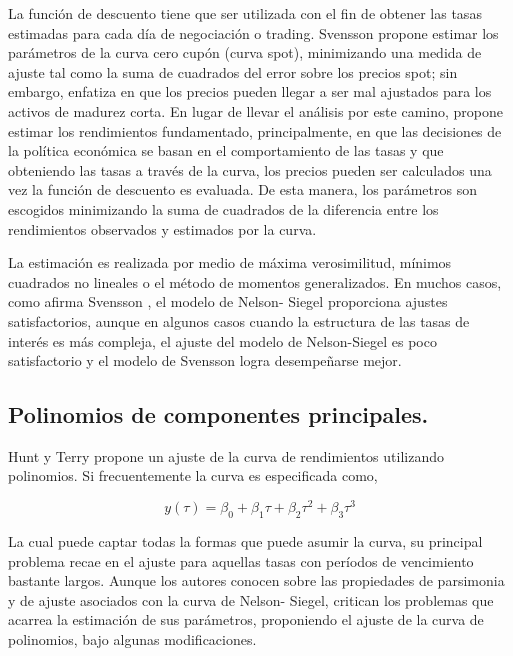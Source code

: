 \hspace*{0.4 cm} La funci\'on de descuento tiene que ser utilizada con el fin de obtener las
tasas estimadas para cada d\'ia de negociaci\'on o trading. Svensson \cite{Sv}
propone estimar los par\'ametros de la curva cero cup\'on (curva spot),
minimizando una medida de ajuste tal como la suma de cuadrados del
error sobre los precios spot; sin embargo, enfatiza en que los precios
pueden llegar a ser mal ajustados para los activos de madurez corta. En
lugar de llevar el an\'alisis por este camino, propone estimar los
rendimientos fundamentado, principalmente, en que las decisiones de la
pol\'itica econ\'omica se basan en el comportamiento de las tasas y que
obteniendo las tasas a trav\'es de la curva, los precios pueden ser
calculados una vez la funci\'on de descuento es evaluada. De esta manera,
los par\'ametros son escogidos minimizando la suma de cuadrados de la
diferencia entre los rendimientos observados y estimados por la curva.

\hspace*{0.4 cm} La estimaci\'on es realizada por medio de m\'axima verosimilitud, m\'inimos
cuadrados no lineales o el m\'etodo de momentos generalizados. En
muchos casos, como afirma Svensson \cite{Sv}, el modelo de Nelson-
Siegel proporciona ajustes satisfactorios, aunque en algunos casos
cuando la estructura de las tasas de inter\'es es m\'as compleja, el ajuste del
modelo de Nelson-Siegel es poco satisfactorio y el modelo de Svensson
logra desempe\~narse mejor.


\subsection{Polinomios de componentes principales.\\}


\hspace*{0.4 cm} Hunt y Terry \cite{HT} propone un ajuste de la curva de rendimientos
utilizando polinomios. Si frecuentemente la curva es especificada como,

\begin{equation}
y(\tau) = \beta_{0} + \beta_{1}\tau +\beta_{2}\tau^2 +\beta_{3}\tau^3
\label{cp}
\end{equation}


\hspace*{0.4 cm} La cual puede captar todas la formas que puede asumir la curva, su
principal problema recae en el ajuste para aquellas tasas con per\'iodos de
vencimiento bastante largos. Aunque los autores conocen sobre las
propiedades de parsimonia y de ajuste asociados con la curva de Nelson-
Siegel, critican los problemas que acarrea la estimaci\'on de sus
par\'ametros, proponiendo el ajuste de la curva de polinomios, bajo
algunas modificaciones.

